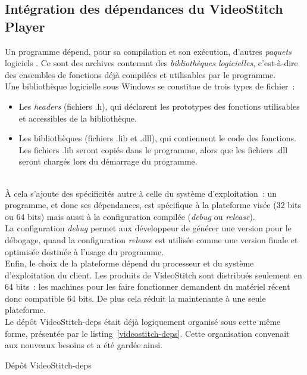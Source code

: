 \subsection{Intégration des dépendances du VideoStitch Player}
\label{integration-dependances-player}
Un programme dépend, pour sa compilation et son exécution, d'autres \emph{paquets} logiciels
\cite{dependance-logicielle}. Ce sont des archives contenant des \emph{bibliothèques logicielles},
c'est-à-dire des ensembles de fonctions déjà compilées et utilisables par le programme.\\
Une bibliothèque logicielle sous Windows se constitue de trois types de fichier\cite{bibliotheque-logicielle}~:
\begin{itemize}
  \item Les \textit{headers} (fichiers .h), qui déclarent les prototypes des fonctions utilisables
  et accessibles de la bibliothèque.
  \item Les bibliothèques (fichiers .lib et .dll), qui contiennent le code des fonctions.
  Les fichiers .lib seront copiés dans le programme, alors que les fichiers .dll seront
  chargés lors du démarrage du programme\cite{bibliotheque-logicielle}.
\end{itemize}
\ \\
À cela s'ajoute des spécificités autre à celle du système d'exploitation~: un programme, et donc
ses dépendances, est spécifique à la plateforme visée (32 bits ou 64 bits)\cite{64-bit-computing}
mais aussi à la configuration compilée (\textit{debug} ou \textit{release})\cite{msdn-debug-release}.\\
La configuration \textit{debug} permet aux développeur de générer une version pour le débogage,
quand la configuration \textit{release} est utilisée comme une version finale et optimisée destinée
à l'usage du programme.\\
Enfin, le choix de la plateforme dépend du processeur et du
système d'exploitation du client. Les produits de VideoStitch sont distribués
seulement en 64 bits~: les machines pour les faire fonctionner demandent du matériel
récent donc compatible 64 bits. De plus cela réduit la maintenante à une seule plateforme.\\
\newline
Le dépôt VideoStitch-deps était déjà logiquement organisé sous cette même forme,
présentée par le listing~\ref{videostitch-deps}.
Cette organisation convenait aux nouveaux besoins et a été gardée ainsi. 
\begin{listing}
  \caption{Dépôt VideoStitch-deps}
  \label{videostitch-deps}
\end{listing}
